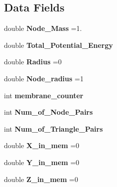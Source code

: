 \subsection*{Data Fields}
\begin{DoxyCompactItemize}
\item 
double {\bfseries Node\+\_\+\+Mass} =1.\hypertarget{classMembrane_abe50bfd82f67d5fa2ed233a9ba7631fc}{}\label{classMembrane_abe50bfd82f67d5fa2ed233a9ba7631fc}

\item 
double {\bfseries Total\+\_\+\+Potential\+\_\+\+Energy}\hypertarget{classMembrane_a75960354fe00e218f119830036810935}{}\label{classMembrane_a75960354fe00e218f119830036810935}

\item 
double {\bfseries Radius} =0\hypertarget{classMembrane_a6d1611097b82cabb54fd45b85faf56cd}{}\label{classMembrane_a6d1611097b82cabb54fd45b85faf56cd}

\item 
double {\bfseries Node\+\_\+radius} =1\hypertarget{classMembrane_a55d6293286907a4848bdb73f58730b20}{}\label{classMembrane_a55d6293286907a4848bdb73f58730b20}

\item 
int {\bfseries membrane\+\_\+counter}\hypertarget{classMembrane_ab26d858b40d68539f31ec9fbd376522e}{}\label{classMembrane_ab26d858b40d68539f31ec9fbd376522e}

\item 
int {\bfseries Num\+\_\+of\+\_\+\+Node\+\_\+\+Pairs}\hypertarget{classMembrane_acfd08625a4fc02f3222b55d0314bb059}{}\label{classMembrane_acfd08625a4fc02f3222b55d0314bb059}

\item 
int {\bfseries Num\+\_\+of\+\_\+\+Triangle\+\_\+\+Pairs}\hypertarget{classMembrane_a3f911bf4b8933e725d5beaa5ab976544}{}\label{classMembrane_a3f911bf4b8933e725d5beaa5ab976544}

\item 
double {\bfseries X\+\_\+in\+\_\+mem} =0\hypertarget{classMembrane_af6ed0c1ab34021f48a6dd14f21eb0c64}{}\label{classMembrane_af6ed0c1ab34021f48a6dd14f21eb0c64}

\item 
double {\bfseries Y\+\_\+in\+\_\+mem} =0\hypertarget{classMembrane_ac0f150a6d43b73a2623d527a8cecefb3}{}\label{classMembrane_ac0f150a6d43b73a2623d527a8cecefb3}

\item 
double {\bfseries Z\+\_\+in\+\_\+mem} =0\hypertarget{classMembrane_aab209cb4603762ae1886325f4f799de5}{}\label{classMembrane_aab209cb4603762ae1886325f4f799de5}


\end{DoxyCompactItemize}
